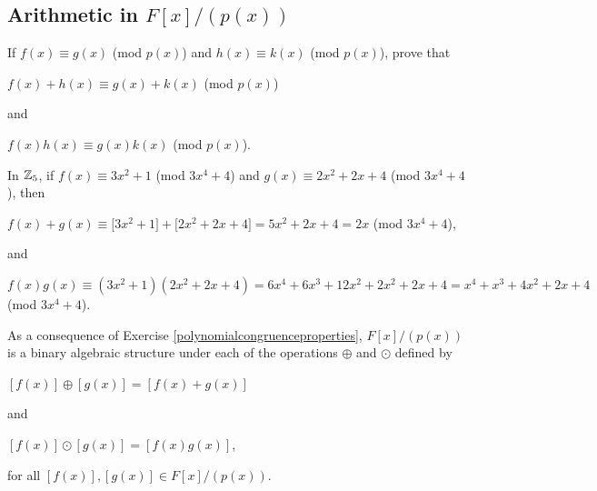 \documentclass[11pt,fleqn,dvipsnames,usenames]{article}
\newcommand{\p}{\noindent}
\begin{document}
\subsection{Arithmetic in \texorpdfstring{$F[x]/(p(x))$}{F[x]/(p(x))}}
%
\begin{exercise}\label{polynomialcongruenceproperties}
If $f(x)\equiv g(x)$ (mod $p(x)$) and $h(x)\equiv k(x)$ (mod $p(x)$), prove that
\begin{center}
$f(x) + h(x) \equiv g(x) + k(x)$ (mod $p(x)$)
\end{center}
and
\begin{center}
$f(x)h(x) \equiv g(x)k(x)$ (mod $p(x)$).
\end{center}
\end{exercise}
%
\begin{example}
In $\mathbb{Z}_5$, if $f(x)\equiv 3x^2 + 1$ (mod $3x^4 + 4$) and $g(x)\equiv 2x^2 + 2x + 4$ (mod $3x^4 + 4$), then
\begin{center}
$f(x) + g(x) \equiv \big[3x^2 + 1\big] + \big[2x^2 + 2x + 4\big] = 5x^2 + 2x + 4= 2x$ (mod $3x^4 + 4$),
\end{center}
and
\vsmsp

\begin{adjustwidth}{-100pt}{-100pt}
\begin{center}
$f(x)g(x) \equiv (3x^2 + 1)(2x^2 + 2x + 4) = 6x^4 + 6x^3 + 12x^2 + 2x^2 + 2x + 4 = x^4 + x^3 + 4x^2 + 2x +4$ (mod $3x^4 + 4$).
\end{center}
\end{adjustwidth}
\end{example}
\vsp

\p As a consequence of Exercise \ref{polynomialcongruenceproperties}, $F[x]/(p(x))$ is a binary algebraic structure under each of the operations $\oplus$ and $\odot$ defined by
\begin{center}
$[f(x)]\oplus [g(x)] = [f(x) + g(x)]$
\end{center}
and
\begin{center}
$[f(x)]\odot [g(x)] = [f(x)g(x)]$,
\end{center}
for all $[f(x)],[g(x)]\in F[x]/(p(x))$.
\vsp
\end{document}
